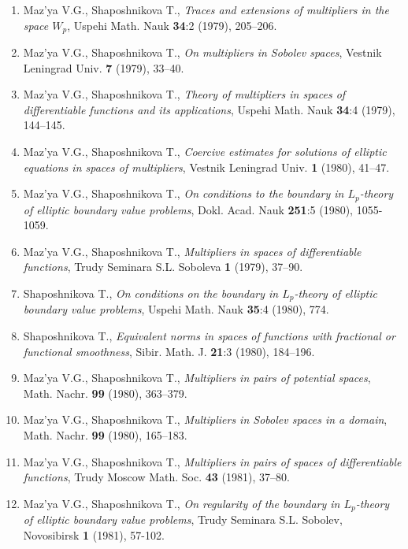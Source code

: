 \documentclass{article}
\begin{document}
\begin{enumerate}
\item Maz'ya V.G., Shaposhnikova T., {\it Traces and extensions of
multipliers in the space
$W_p$}, Uspehi Math. Nauk {\bf 34}:2 (1979), 205--206.

\item Maz'ya V.G., Shaposhnikova T., {\it On multipliers in Sobolev
spaces}, Vestnik Leningrad Univ. {\bf 7}
(1979), 33--40.

\item Maz'ya V.G., Shaposhnikova T., {\it Theory of multipliers in
spaces of differentiable functions
and its applications}, Uspehi Math. Nauk {\bf 34}:4 (1979), 144--145.


\item Maz'ya V.G., Shaposhnikova T., {\it Coercive estimates for
solutions of elliptic equations in
spaces of multipliers}, Vestnik Leningrad Univ. {\bf 1} (1980),
41--47.

\item Maz'ya V.G., Shaposhnikova T., {\it On conditions to the
boundary in $L_p$-theory of elliptic
boundary value problems}, Dokl. Acad. Nauk {\bf 251}:5 (1980),
1055-1059.

\item Maz'ya V.G., Shaposhnikova T., {\it Multipliers in spaces of
differentiable functions}, Trudy
Seminara S.L. Soboleva {\bf 1} (1979), 37--90.

\item Shaposhnikova T., {\it On conditions on the boundary in
$L_p$-theory of elliptic
boundary value problems}, Uspehi Math. Nauk {\bf 35}:4 (1980), 774.

\item Shaposhnikova T., {\it Equivalent norms in spaces of functions
with fractional or
functional smoothness}, Sibir. Math. J. {\bf 21}:3 (1980), 184--196.

\item Maz'ya V.G., Shaposhnikova T., {\it Multipliers in pairs of
potential spaces}, Math. Nachr. {\bf 99}
(1980), 363--379.

\item Maz'ya V.G., Shaposhnikova T., {\it Multipliers in Sobolev
spaces in a domain}, Math. Nachr. {\bf 99}
(1980), 165--183.

\item Maz'ya V.G., Shaposhnikova T., {\it Multipliers in pairs of
spaces of differentiable functions},
Trudy Moscow Math. Soc. {\bf 43} (1981), 37--80.

\item Maz'ya V.G., Shaposhnikova T., {\it On regularity of the
boundary in $L_p$-theory of elliptic
boundary value problems}, Trudy Seminara S.L. Sobolev, Novosibirsk
{\bf 1}
(1981), 57-102.


\end{enumerate}
\end{document}
